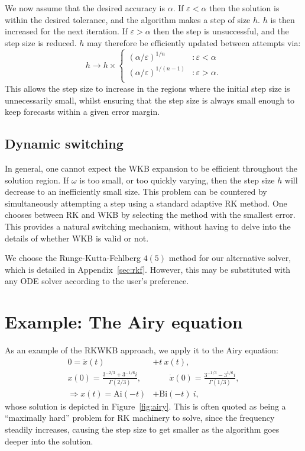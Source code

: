We now assume that the desired accuracy is \(\alpha\). If \(\varepsilon<\alpha\) then the solution is within the desired tolerance, and the algorithm makes a step of size \(h\). \(h\) is then increased for the next iteration. If \(\varepsilon>\alpha\) then the step is unsuccessful, and the step size is reduced. \(h\) may therefore be efficiently updated between attempts via:
\begin{equation}
  h \to h\times\left\{
  \begin{array}{lr}
    {(\alpha/\varepsilon)}^{1/n} &: \varepsilon<\alpha \\
    {(\alpha/\varepsilon)}^{1/(n-1)} &: \varepsilon>\alpha. \\
  \end{array}
  \right.\label{eqn:h_update}
\end{equation}
This allows the step size to increase in the regions where the initial step size is unnecessarily small, whilst ensuring that the step size is always small enough to keep forecasts within a given error margin.

\subsection{Dynamic switching}
In general, one cannot expect the WKB expansion to be efficient throughout the solution region. If \(\omega\) is too small, or too quickly varying, then the step size \(h\) will decrease to an inefficiently small size. This problem can be countered by simultaneously attempting a step using a standard adaptive RK method. One chooses between RK and WKB by selecting the method with the smallest error. This provides a natural switching mechanism, without having to delve into the details of whether WKB is valid or not.

We choose the Runge-Kutta-Fehlberg \(4(5)\) method for our alternative solver, which is detailed in Appendix~\ref{sec:rkf}. However, this may be substituted with any ODE solver according to the user's preference.

\section{Example: The Airy equation}


As an example of the RKWKB approach, we apply it to the Airy equation:
\begin{align}
  0=\ddot{x}(t) &+ t\: x(t) ,
  \label{eqn:airy_equation}\\
  x(0)=\frac{3^{-2/3}+3^{-1/6}i}{\Gamma(2/3)},
  &\qquad
  \dot{x}(0) = \frac{3^{-1/3}-3^{1/6}i}{\Gamma(1/3)},
  \\
  \Rightarrow x(t) = \mathrm{Ai}(-t) &+ \mathrm{Bi}(-t)\:i,
  \label{eqn:airy_solution}
\end{align}
whose solution is depicted in Figure~\ref{fig:airy}. This is often quoted as being a ``maximally hard'' problem for RK machinery to solve, since the frequency steadily increases, causing the step size to get smaller as the algorithm goes deeper into the solution.


